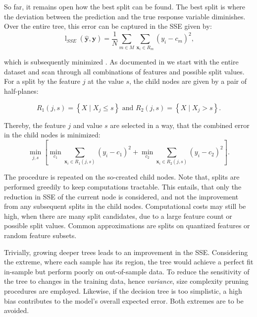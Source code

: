 So far, it remains open how the best split can be found. The best split is where the deviation between the prediction and the true response variable diminishes. Over the entire tree, this error can be captured in the \gls{SSE} given by:
\begin{equation}
    \operatorname{l}_{SSE}(\widehat{\mathbf{y}},\mathbf{y})=\frac{1}{N} \sum_{m \in M} \sum_{\mathbf{x}_{i} \in R_m}\left(y_{i}-c_{m}\right)^{2},
\end{equation}

which is subsequently minimized \textcite[][231]{breimanClassificationRegressionTrees2017}. As documented in \textcite[][326]{hastietrevorElementsStatisticalLearning2009} we start with the entire dataset and scan through all combinations of features and possible split values. For a split by the feature $j$ at the value $s$, the child nodes are given by a pair of half-planes:

\begin{equation}
    R_1(j, s)=\left\{X \mid X_j \leq s\right\} \text { and } R_2(j, s)=\left\{X \mid X_j>s\right\}.
\end{equation}

Thereby, the feature $j$ and value $s$ are selected in a way, that the combined error in the child nodes is minimized:
\begin{equation}
    \min _{j, s}\left[\min _{c_1} \sum_{\mathbf{x}_i \in R_1(j, s)}\left(y_i-c_1\right)^2+\min _{c_2} \sum_{\mathbf{x}_i \in R_2(j, s)}\left(y_i-c_2\right)^2\right].
\end{equation}

The procedure is repeated on the so-created child nodes. Note that, splits are performed greedily to keep computations tractable. This entails, that only the reduction in \gls{SSE} of the current node is considered, and not the improvement from any subsequent splits in the child nodes. Computational costs may still be high, when there are many split candidates, due to a large feature count or possible split values. Common approximations are splits on quantized features or random feature subsets.

Trivially, growing deeper trees leads to an improvement in the \gls{SSE}. Considering the extreme, where each sample has its region, the tree would achieve a perfect fit in-sample but perform poorly on out-of-sample data. To reduce the sensitivity of the tree to changes in the training data, hence \emph{variance}, size complexity pruning procedures are employed. Likewise, if the decision tree is too simplistic, a high bias contributes to the model's overall expected error. Both extremes are to be avoided.

